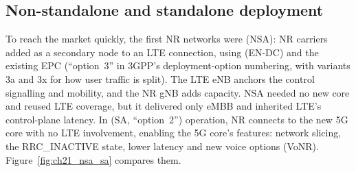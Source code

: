 \subsection{Non-standalone and standalone deployment}

To reach the market quickly, the first NR networks were  (NSA): NR carriers
added as a secondary node to an LTE connection, using  (EN-DC) and
the existing EPC (``option~3'' in 3GPP's deployment-option numbering, with variants 3a and 3x for how
user traffic is split). The LTE eNB anchors the control signalling and mobility, and the NR gNB adds
capacity. NSA needed no new core and reused LTE coverage, but it delivered only eMBB and inherited
LTE's control-plane latency. In  (SA, ``option~2'') operation, NR connects to the new
5G core with no LTE involvement, enabling the 5G core's features: network slicing, the RRC\_INACTIVE
state, lower latency and new voice options (VoNR). Figure~\ref{fig:ch21_nsa_sa} compares them.

